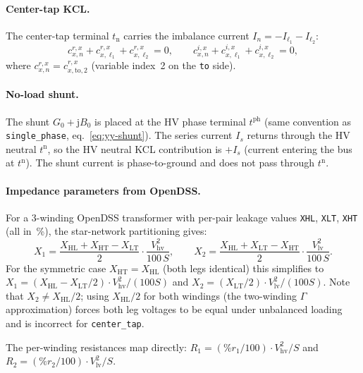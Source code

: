 \documentclass[11pt,a4paper]{article}
\begin{document}
\paragraph{Center-tap KCL.}
The center-tap terminal $t_\text{n}$ carries the imbalance current
$I_n = -I_{\ell_1} - I_{\ell_2}$:
%
\begin{equation}
  c^{r,x}_{x,n} + c^{r,x}_{x,\ell_1} + c^{r,x}_{x,\ell_2} = 0,
  \qquad
  c^{i,x}_{x,n} + c^{i,x}_{x,\ell_1} + c^{i,x}_{x,\ell_2} = 0,
  \label{eq:ct-n}
\end{equation}
%
where $c^{r,x}_{x,n} = c^{r,x}_{x,\text{to},2}$ (variable index~2 on the
\texttt{to} side).

\paragraph{No-load shunt.}
The shunt $G_0 + \mathrm{j}B_0$ is placed at the HV phase terminal
$t^\text{ph}$ (same convention as \texttt{single\_phase}, eq.~\eqref{eq:yy-shunt}).
The series current $I_s$ returns through the HV neutral $t^\text{n}$, so
the HV neutral KCL contribution is $+I_s$ (current entering the bus at $t^\text{n}$).
The shunt current is phase-to-ground and does not pass through $t^\text{n}$.

\paragraph{Impedance parameters from OpenDSS.}
For a 3-winding OpenDSS transformer with per-pair leakage values
\texttt{XHL}, \texttt{XLT}, \texttt{XHT} (all in~\%), the star-network
partitioning gives:
%
\begin{equation}
  X_1 = \frac{X_\text{HL} + X_\text{HT} - X_\text{LT}}{2}
        \cdot \frac{V_\text{hv}^2}{100\,S},
  \qquad
  X_2 = \frac{X_\text{HL} + X_\text{LT} - X_\text{HT}}{2}
        \cdot \frac{V_\text{lv}^2}{100\,S}.
  \label{eq:ct-star}
\end{equation}
%
For the symmetric case $X_\text{HT} = X_\text{HL}$ (both legs identical)
this simplifies to
$X_1 = (X_\text{HL} - X_\text{LT}/2)\cdot V_\text{hv}^2/(100S)$
and $X_2 = (X_\text{LT}/2)\cdot V_\text{lv}^2/(100S)$.
Note that $X_2 \neq X_\text{HL}/2$; using $X_\text{HL}/2$ for both windings
(the two-winding $\Gamma$ approximation) forces both leg voltages to be equal
under unbalanced loading and is incorrect for \texttt{center\_tap}.

The per-winding resistances map directly:
$R_1 = (\%r_1/100)\cdot V_\text{hv}^2/S$ and
$R_2 = (\%r_2/100)\cdot V_\text{lv}^2/S$.
\end{document}
